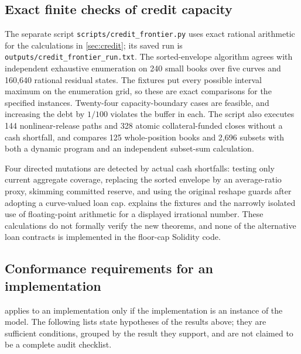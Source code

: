 \subsection{Exact finite checks of credit capacity}\label{sec:credit-checks}

The separate script \texttt{scripts/credit\_frontier.py} uses exact rational arithmetic for the calculations in \cref{sec:credit}; its saved run is \texttt{outputs/credit\_frontier\_run.txt}. The sorted-envelope algorithm agrees with independent exhaustive enumeration on 240 small books over five curves and 160{,}640 rational residual states. The fixtures put every possible interval maximum on the enumeration grid, so these are exact comparisons for the specified instances. Twenty-four capacity-boundary cases are feasible, and increasing the debt by $1/100$ violates the buffer in each. The script also executes 144 nonlinear-release paths and 328 atomic collateral-funded closes without a cash shortfall, and compares 125 whole-position books and 2{,}696 subsets with both a dynamic program and an independent subset-sum calculation.

Four directed mutations are detected by actual cash shortfalls: testing only current aggregate coverage, replacing the sorted envelope by an average-ratio proxy, skimming committed reserve, and using the original reshape guards after adopting a curve-valued loan cap.  explains the fixtures and the narrowly isolated use of floating-point arithmetic for a displayed irrational number. These calculations do not formally verify the new theorems, and none of the alternative loan contracts is implemented in the floor-cap Solidity code.

\subsection{Conformance requirements for an implementation}\label{sec:conformance}

 applies to an implementation only if the implementation is an instance of the model. The following lists state hypotheses of the results above; they are sufficient conditions, grouped by the result they support, and are not claimed to be a complete audit checklist.

